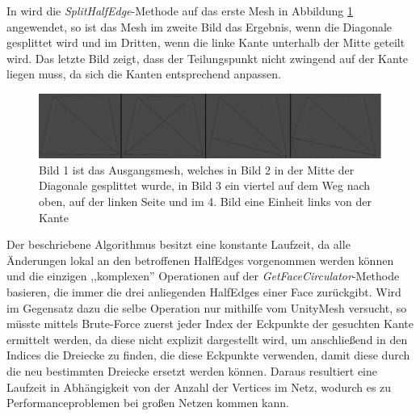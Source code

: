 In wird die \textit{SplitHalfEdge}-Methode auf das erste Mesh in Abbildung \ref{fig:meshmash} angewendet, so ist das Mesh im zweite Bild das Ergebnis, wenn die Diagonale gesplittet wird und im Dritten, wenn die linke Kante unterhalb der Mitte geteilt wird. Das letzte Bild zeigt, dass der Teilungspunkt nicht zwingend auf der Kante liegen muss, da sich die Kanten entsprechend anpassen.
\begin{figure}[H]
	\centering
	\includegraphics[width=1 \linewidth]{Images/meshmash}
	\caption{Bild 1 ist das Ausgangsmesh, welches in Bild 2 in der Mitte der Diagonale gesplittet wurde, in Bild 3 ein viertel auf dem Weg nach oben, auf der linken Seite und im 4. Bild eine Einheit links von der Kante}
	\label{fig:meshmash}
\end{figure}

Der beschriebene Algorithmus besitzt eine konstante Laufzeit, da alle \"Anderungen lokal an den betroffenen HalfEdges vorgenommen werden k\"onnen und die einzigen ,,komplexen'' Operationen auf der \textit{GetFaceCirculator}-Methode basieren, die immer die drei anliegenden HalfEdges einer Face zur\"uckgibt. Wird im Gegensatz dazu die selbe Operation nur mithilfe vom UnityMesh versucht, so m\"usste mittels Brute-Force zuerst jeder Index der Eckpunkte der gesuchten Kante ermittelt werden, da diese nicht explizit dargestellt wird, um anschlie{\ss}end in den Indices die Dreiecke zu finden, die diese Eckpunkte verwenden, damit diese durch die neu bestimmten Dreiecke ersetzt werden k\"onnen. Daraus resultiert eine Laufzeit in Abh\"angigkeit von der Anzahl der Vertices im Netz, wodurch es zu Performanceproblemen bei gro{\ss}en Netzen kommen kann.

